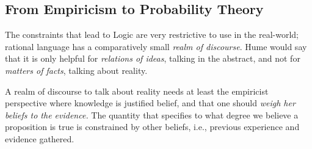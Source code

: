 \documentclass[
  letterpaper,
  12pt,
  british]{tufte-book}
\theoremstyle{plain}
\theoremstyle{definition}
\theoremstyle{plain}
\theoremstyle{remark}
\begin{document}
\hypertarget{sec-from_empiricism}{%
\subsection{From Empiricism to Probability
Theory}\label{sec-from_empiricism}}

The constraints that lead to Logic are very restrictive to use in the
real-world; rational language has a comparatively small \emph{realm of
discourse}. Hume would say that it is only helpful for \emph{relations
of ideas}, talking in the abstract, and not for \emph{matters of facts},
talking about reality.

A realm of discourse to talk about reality needs at least the empiricist
perspective where knowledge is justified belief, and that one should
\emph{weigh her beliefs to the evidence.} The quantity that specifies to
what degree we believe a proposition is true is constrained by other
beliefs, i.e., previous experience and evidence gathered.
\end{document}
